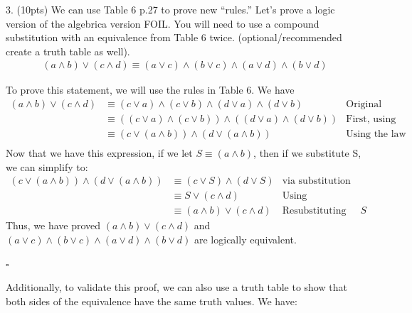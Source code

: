 \documentclass{article}
\newcommand{\sectionbreak}{\clearpage}
\begin{document}
\sectionbreak

3. (10pts) We can use Table 6 p.27 to prove new “rules.” Let's prove a logic version of the algebrica version FOIL. You will need to use a compound substitution with an
equivalence from Table 6 twice. (optional/recommended create a truth table as well).
\begin{align*}
    (a \land b) \lor (c \land d) \equiv (a \lor c) \land (b \lor c) \land (a \lor d) \land (b \lor d)
\end{align*}

To prove this statement, we will use the rules in Table 6. We have
\begin{align*}
    (a \land b) \lor (c \land d) &\equiv (c \lor a) \land (c \lor b) \land (d \lor a) \land (d \lor b) & \text{Original Statement, rearranged...} \\
    &\equiv  ((c \lor a) \land (c \lor b)) \land ((d \lor a) \land (d \lor b)) & \text{First, using laws of associativity...} \\
    &\equiv  (c \lor (a \land b)) \land (d \lor (a \land b)) & \text{Using the law of distribution, we have...} \\
\end{align*}
Now that we have this expression, if we let $S \equiv (a \land b)$, then if we substitute S, we can simplify to:
\begin{align*}
    (c \lor (a \land b)) \land (d \lor (a \land b)) &\equiv (c \lor S) \land (d \lor S) & \text{via substitution}\\
    &\equiv S \lor (c \land d) & \text{Using distributive laws again...} \\
    &\equiv (a \land b) \lor (c \land d) & \text{Resubstituting the definition of $S$}
\end{align*}
Thus, we have proved $(a \land b) \lor (c \land d)$ and $(a \lor c) \land (b \lor c) \land (a \lor d) \land (b \lor d)$ are logically equivalent.

\hfill $\square$

\bigbreak
Additionally, to validate this proof, we can also use a truth table to show that both sides of the equivalence have the same truth values. We have:

\medbreak
\end{document}
